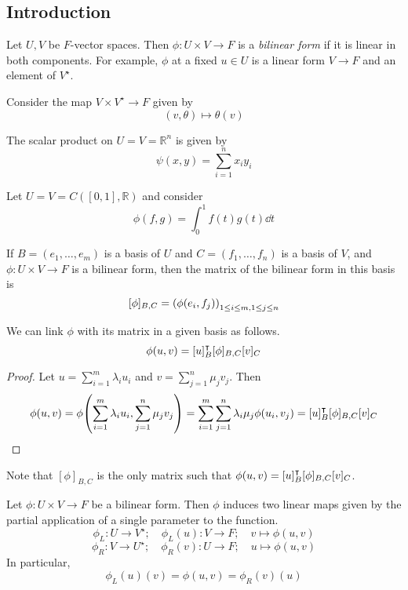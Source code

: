 \subsection{Introduction}
\begin{definition}
	Let \( U, V \) be \( F \)-vector spaces.
	Then \( \phi \colon U \times V \to F \) is a \textit{bilinear form} if it is linear in both components.
	For example, \( \phi \) at a fixed \( u \in U \) is a linear form \( V \to F \) and an element of \( V^\star \).
\end{definition}
\begin{example}
	Consider the map \( V \times V^\star \to F \) given by
	\[ (v, \theta) \mapsto \theta(v) \]
\end{example}
\begin{example}
	The scalar product on \( U = V = \mathbb R^n \) is given by
	\[ \psi(x, y) = \sum_{i=1}^n x_i y_i \]
\end{example}
\begin{example}
	Let \( U = V = C([0,1], \mathbb R) \) and consider
	\[ \phi(f,g) = \int_0^1 f(t)g(t) \dd{t} \]
\end{example}
\begin{definition}
	If \( B = (e_1, \dots, e_m) \) is a basis of \( U \) and \( C = (f_1, \dots, f_n) \) is a basis of \( V \), and \( \phi \colon U \times V \to F \) is a bilinear form, then the matrix of the bilinear form in this basis is
	\[ [\phi]_{B, C} = \qty( \phi(e_i, f_j) )_{1 \leq i \leq m, 1 \leq j \leq n} \]
\end{definition}
\begin{lemma}
	We can link \( \phi \) with its matrix in a given basis as follows.
	\[ \phi(u,v) = [u]_B^\intercal [\phi]_{B, C} [v]_C \]
\end{lemma}
\begin{proof}
	Let \( u = \sum_{i=1}^m \lambda_i u_i \) and \( v = \sum_{j=1}^n \mu_j v_j \).
	Then
	\[ \phi(u,v) = \phi\qty( \sum_{i=1}^m \lambda_i u_i, \sum_{j=1}^n \mu_j v_j ) = \sum_{i=1}^m \sum_{j=1}^n \lambda_i \mu_j \phi(u_i, v_j) = [u]_B^\intercal [\phi]_{B,C} [v]_C \]
\end{proof}
\begin{remark}
	Note that \( [\phi]_{B,C} \) is the only matrix such that \( \phi(u,v) = [u]_B^\intercal [\phi]_{B, C} [v]_C \).
\end{remark}
\begin{definition}
	Let \( \phi \colon U \times V \to F \) be a bilinear form.
	Then \( \phi \) induces two linear maps given by the partial application of a single parameter to the function.
	\[ \phi_L \colon U \to V^\star;\quad \phi_L(u) \colon V \to F;\quad v \mapsto \phi(u,v) \]
	\[ \phi_R \colon V \to U^\star;\quad \phi_R(v) \colon U \to F;\quad u \mapsto \phi(u,v) \]
	In particular,
	\[ \phi_L(u)(v) = \phi(u,v) = \phi_R(v)(u) \]
\end{definition}
